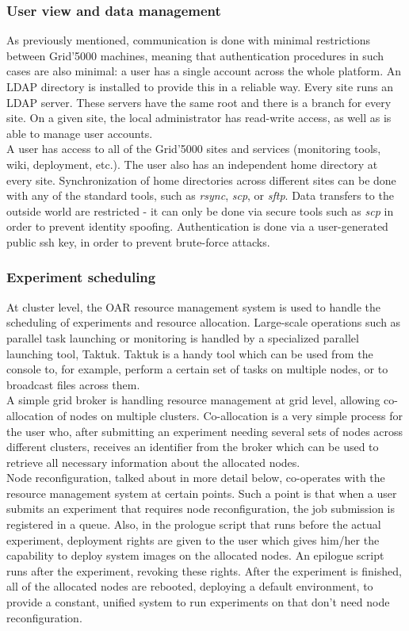 \subsubsection{User view and data management}
As previously mentioned, communication is done with minimal
restrictions between Grid'5000 machines, meaning that authentication
procedures in such cases are also minimal: a user has a single account
across the whole platform. An LDAP directory is installed to provide
this in a reliable way. Every site runs an LDAP server. These servers
have the same root and there is a branch for every site. On a given
site, the local administrator has read-write access, as well as is
able to manage user accounts.\\
A user has access to all of the Grid'5000 sites and services
(monitoring tools, wiki, deployment, etc.). The user also has an
independent home directory at every site. Synchronization of home
directories across different sites can
be done with any of the standard tools, such as \emph{rsync},
\emph{scp}, or \emph{sftp}. Data transfers to the outside world are
restricted - it can only be done via secure tools such as \emph{scp}
in order to prevent identity spoofing. Authentication is done via a
user-generated public ssh key, in order to prevent brute-force
attacks.
\subsubsection{Experiment scheduling}
\label{sec:experiment_scheduling}
At cluster level, the OAR\cite{xdghmmnr05} resource management system is
used to handle the scheduling of experiments and resource
allocation. Large-scale operations such as parallel task launching or
monitoring is handled by a specialized parallel launching tool,
Taktuk\cite{chr09}. Taktuk is a handy tool which can be used from the
console to, for example, perform a certain set of tasks on multiple
nodes, or to broadcast files across them.\\
A simple grid broker is handling resource management at grid
level, allowing co-allocation of nodes on multiple
clusters. Co-allocation is a very simple process for the user who,
after submitting an experiment needing several sets of nodes across
different clusters, receives an identifier from the broker which can
be used to retrieve all necessary information about the allocated
nodes.\\
Node reconfiguration, talked about in more detail below, co-operates
with the resource management system at certain points. Such a point is
that when a user submits an experiment that requires node
reconfiguration, the job submission is registered in a queue. Also, in
the prologue script that runs before the actual experiment, deployment
rights are given to the user which gives him/her the capability to
deploy system images on the allocated nodes. An epilogue script runs
after the experiment, revoking these rights. After the experiment is
finished, all of the allocated nodes are rebooted, deploying a default
environment, to provide a constant, unified system to run experiments
on that don't need node reconfiguration.
